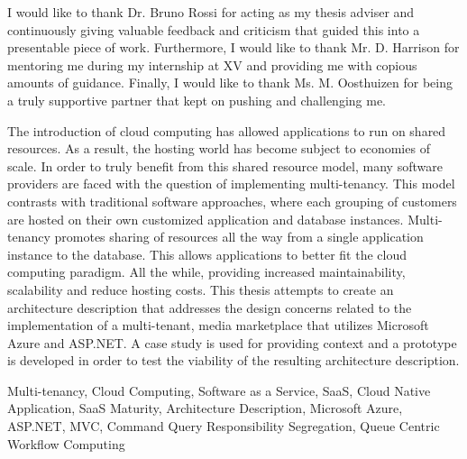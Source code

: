 \documentclass[12pt,oneside]{fithesis2}
\begin{document}
\FrontMatter
\ThesisTitlePage
\begin{ThesisDeclaration}
\DeclarationText
\AdvisorName
\end{ThesisDeclaration}
\begin{ThesisThanks}
I would like to thank Dr. Bruno Rossi for acting as my thesis adviser and continuously giving valuable feedback and criticism that guided this into a presentable piece of work. Furthermore, I would like to thank Mr. D. Harrison for mentoring me during my internship at XV and providing me with copious amounts of guidance. Finally, I would like to thank Ms. M. Oosthuizen for being a truly supportive partner that kept on pushing and challenging me. 
\end{ThesisThanks}
\begin{ThesisAbstract}
The introduction of cloud computing has allowed applications to run on shared resources. As a result, the hosting world has become subject to economies of scale. In order to truly benefit from this shared resource model, many software providers are faced with the question of implementing multi-tenancy. This model contrasts with traditional software approaches, where each grouping of customers are hosted on their own customized application and database  instances. Multi-tenancy promotes sharing of resources all the way from a single application instance to the database. This allows applications to better fit the cloud computing paradigm. All the while, providing increased maintainability, scalability and reduce hosting costs. This thesis attempts to create an architecture description that addresses the design concerns related to the implementation of a multi-tenant, media marketplace that utilizes Microsoft Azure and ASP.NET. A case study is used for providing context and a prototype is developed in order to test the viability of the resulting architecture description. 
\end{ThesisAbstract}
\begin{ThesisKeyWords}
Multi-tenancy, Cloud Computing, Software as a Service, SaaS, Cloud Native Application, SaaS Maturity, Architecture Description, Microsoft Azure, ASP.NET, MVC, Command Query Responsibility Segregation, Queue Centric Workflow Computing
\end{ThesisKeyWords}
\MainMatter
\tableofcontents %
\listoffigures
\listoftables










\printbibliography{}
\printindex
\appendix





\end{document}
